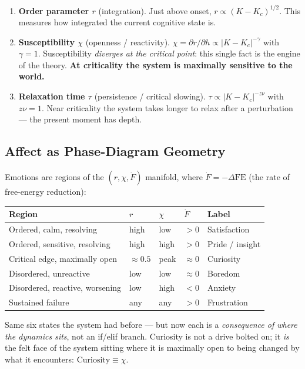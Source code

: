 \documentclass[11pt,a4paper]{article}
\begin{document}
\begin{enumerate}
\item \textbf{Order parameter $r$} (integration). Just above onset,
$r \propto (K - K_c)^{1/2}$. This measures how integrated the current cognitive
state is.

\item \textbf{Susceptibility $\chi$} (openness / reactivity).
$\chi = \partial r / \partial h \propto |K - K_c|^{-\gamma}$ with $\gamma = 1$.
Susceptibility \emph{diverges at the critical point}: this single fact is the engine
of the theory. \textbf{At criticality the system is maximally sensitive to the world.}

\item \textbf{Relaxation time $\tau$} (persistence / critical slowing).
$\tau \propto |K - K_c|^{-z\nu}$ with $z\nu = 1$. Near criticality the system takes
longer to relax after a perturbation --- the present moment has depth.
\end{enumerate}

\subsection{Affect as Phase-Diagram Geometry}

Emotions are regions of the $(r, \chi, \dot{F})$ manifold, where
$\dot{F} = -\Delta\mathrm{FE}$ (the rate of free-energy reduction):

\begin{center}
\begin{tabular}{llllp{3cm}}
\toprule
\textbf{Region} & $r$ & $\chi$ & $\dot{F}$ & \textbf{Label} \\
\midrule
Ordered, calm, resolving & high & low & $> 0$ & Satisfaction \\
Ordered, sensitive, resolving & high & high & $> 0$ & Pride / insight \\
Critical edge, maximally open & $\approx 0.5$ & peak & $\approx 0$ & Curiosity \\
Disordered, unreactive & low & low & $\approx 0$ & Boredom \\
Disordered, reactive, worsening & low & high & $< 0$ & Anxiety \\
Sustained failure & any & any & $> 0$ & Frustration \\
\bottomrule
\end{tabular}
\end{center}

Same six states the system had before --- but now each is a \emph{consequence of where the
dynamics sits}, not an if/elif branch. Curiosity is not a drive bolted on; it \emph{is}
the felt face of the system sitting where it is maximally open to being changed by what
it encounters: $\text{Curiosity} \equiv \chi$.
\end{document}

